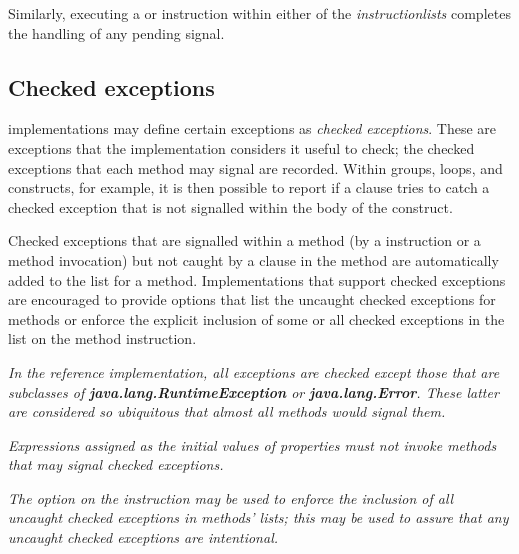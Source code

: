 Similarly, executing a 
or  instruction within either of the
\emph{instructionlists} completes the handling of any pending
signal.
\subsection{Checked exceptions}\label{refchecked}
 
\nr{} implementations may define certain exceptions as \emph{checked
exceptions}.  These are exceptions that the implementation considers
it useful to check; the checked exceptions that each method may signal
are recorded.  Within  groups,  loops, and
 constructs, for example, it is then possible to report
if a  clause tries to catch a checked exception that is
not signalled within the body of the construct.
 
Checked exceptions that are signalled within a method (by a
 instruction or a method invocation) but not caught by a
 clause in the method are automatically added to the
 list for a method.  Implementations that support
checked exceptions are encouraged to provide options that list the
uncaught checked exceptions for methods or enforce the explicit
inclusion of some or all checked exceptions in the  list
on the method instruction.
 
\emph{In the reference implementation, all exceptions are checked except
those that are subclasses of \textbf{java.lang.RuntimeException}
or \textbf{java.lang.Error}.  These latter are considered so
ubiquitous that almost all methods would signal them.}
 
\emph{Expressions assigned as the initial values of properties must not invoke
methods that may signal checked exceptions.}
 
\emph{The  option on the  instruction may
be used to enforce the inclusion of all uncaught checked exceptions in
methods'  lists; this may be used to assure that
any uncaught checked exceptions are intentional.}
